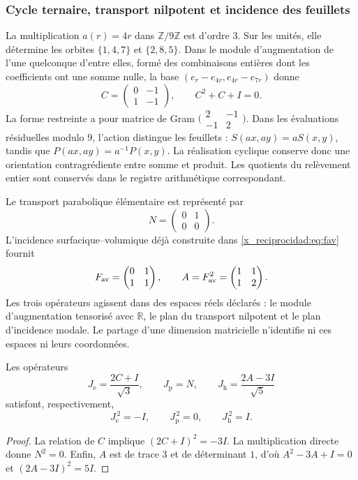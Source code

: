 \subsubsection{Cycle ternaire, transport nilpotent et incidence des feuillets}

La multiplication \(a(r)=4r\) dans \(\mathbb Z/9\mathbb Z\) est d’ordre
\(3\). Sur les unités, elle détermine les orbites \(\{1,4,7\}\) et
\(\{2,8,5\}\). Dans le module d’augmentation de l’une quelconque d’entre elles, formé
des combinaisons entières dont les coefficients ont une somme nulle, la base
\((e_r-e_{4r},e_{4r}-e_{7r})\) donne
\[
 C=\begin{pmatrix}0&-1\\1&-1\end{pmatrix},
 \qquad C^2+C+I=0.
\]
La forme restreinte a pour matrice de Gram
\(\bigl(\begin{smallmatrix}2&-1\\-1&2\end{smallmatrix}\bigr)\).
Dans les évaluations résiduelles modulo \(9\), l’action distingue les feuillets :
\(S(ax,ay)=aS(x,y)\), tandis que \(P(ax,ay)=a^{-1}P(x,y)\).
La réalisation cyclique conserve donc une orientation contragrédiente
entre somme et produit. Les quotients du relèvement entier sont conservés
dans le registre arithmétique correspondant.

Le transport parabolique élémentaire est représenté par
\[
 N=\begin{pmatrix}0&1\\0&0\end{pmatrix}.
\]
L’incidence surfacique--volumique déjà construite dans \eqref{x_reciprocidad:eq:fav} fournit
\[
 F_{\rm av}=\begin{pmatrix}0&1\\1&1\end{pmatrix},
 \qquad A=F_{\rm av}^2=\begin{pmatrix}1&1\\1&2\end{pmatrix}.
\]
Les trois opérateurs agissent dans des espaces réels déclarés : le module
d’augmentation tensorisé avec \(\mathbb R\), le plan du transport nilpotent et
le plan d’incidence modale. Le partage d’une dimension matricielle n’identifie
ni ces espaces ni leurs coordonnées.

\begin{proposition}
\label{x_reciprocidad:euler-trit-generadores}
Les opérateurs
\[
 J_{\mathrm e}=\frac{2C+I}{\sqrt3},\qquad
 J_{\mathrm p}=N,\qquad
 J_{\mathrm h}=\frac{2A-3I}{\sqrt5}
\]
satisfont, respectivement,
\[
 J_{\mathrm e}^{\,2}=-I,\qquad
 J_{\mathrm p}^{\,2}=0,\qquad
 J_{\mathrm h}^{\,2}=I.
\]
\end{proposition}
\begin{proof}
La relation de \(C\) implique \((2C+I)^2=-3I\).
La multiplication directe donne \(N^2=0\).
Enfin, \(A\) est de trace \(3\) et de déterminant \(1\), d’où
\(A^2-3A+I=0\) et \((2A-3I)^2=5I\).
\end{proof}

